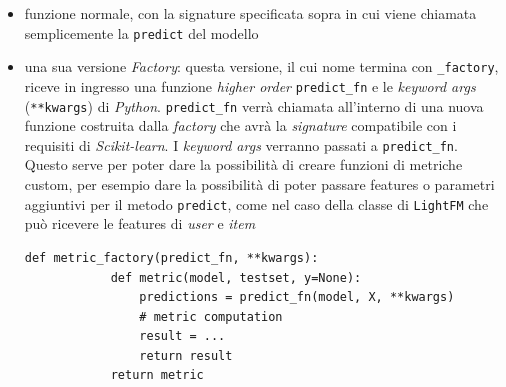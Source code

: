 \begin{itemize}
    \item funzione normale, con la signature specificata sopra in cui viene chiamata semplicemente la \texttt{predict} del modello
    \item una sua versione \textit{Factory}: questa versione, il cui nome termina con \texttt{\_factory}, riceve in ingresso una funzione \textit{higher order} \texttt{predict\_fn} e le \textit{keyword args} (\texttt{**kwargs}) di \textit{Python}. \texttt{predict\_fn} verrà chiamata all'interno di una nuova funzione costruita dalla \textit{factory} che avrà la \textit{signature} compatibile con i requisiti di \textit{Scikit-learn}. I \textit{keyword args} verranno passati a \texttt{predict\_fn}. Questo serve per poter dare la possibilità di creare funzioni di metriche custom, per esempio dare la possibilità di poter passare features o parametri aggiuntivi per il metodo \texttt{predict}, come nel caso della classe di \texttt{LightFM} che può ricevere le features di \textit{user} e \textit{item}
    \begin{lstlisting}[caption=Implementazione in pseudo codice di una \textit{factory} per una metrica generica ]
        def metric_factory(predict_fn, **kwargs):
            def metric(model, testset, y=None):
                predictions = predict_fn(model, X, **kwargs)
                # metric computation
                result = ...
                return result
            return metric
    \end{lstlisting}
\end{itemize}